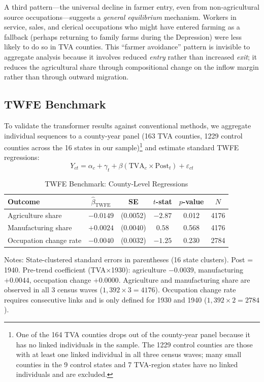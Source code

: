 \documentclass[12pt]{article}
\begin{document}
A third pattern---the universal decline in farmer entry, even from non-agricultural source occupations---suggests a \textit{general equilibrium} mechanism. Workers in service, sales, and clerical occupations who might have entered farming as a fallback (perhaps returning to family farms during the Depression) were less likely to do so in TVA counties. This ``farmer avoidance'' pattern is invisible to aggregate analysis because it involves reduced \textit{entry} rather than increased \textit{exit}; it reduces the agricultural share through compositional change on the inflow margin rather than through outward migration.

\subsection{TWFE Benchmark}

To validate the transformer results against conventional methods, we aggregate individual sequences to a county-year panel (163 TVA counties, \num{1229} control counties across the 16 states in our sample)\footnote{One of the 164 TVA counties drops out of the county-year panel because it has no linked individuals in the sample. The \num{1229} control counties are those with at least one linked individual in all three census waves; many small counties in the 9 control states and 7 TVA-region states have no linked individuals and are excluded.} and estimate standard TWFE regressions:
\begin{equation}
Y_{ct} = \alpha_c + \gamma_t + \beta (\text{TVA}_c \times \text{Post}_t) + \varepsilon_{ct}
\end{equation}

\begin{table}[H]
\centering
\caption{TWFE Benchmark: County-Level Regressions}
\label{tab:twfe}
\begin{threeparttable}
\begin{tabular}{lccccc}
\toprule
Outcome & $\hat{\beta}_{\text{TWFE}}$ & SE & $t$-stat & $p$-value & $N$ \\
\midrule
Agriculture share & $-0.0149$ & (0.0052) & $-2.87$ & 0.012 & \num{4176} \\
Manufacturing share & $+0.0024$ & (0.0040) & $0.58$ & 0.568 & \num{4176} \\
Occupation change rate & $-0.0040$ & (0.0032) & $-1.25$ & 0.230 & \num{2784} \\
\bottomrule
\end{tabular}
\begin{tablenotes}[flushleft]
\small
\item Notes: State-clustered standard errors in parentheses (16 state clusters). Post = 1940. Pre-trend coefficient (TVA$\times$1930): agriculture $-0.0039$, manufacturing $+0.0044$, occupation change $+0.0000$. Agriculture and manufacturing share are observed in all 3 census waves ($1{,}392 \times 3 = \num{4176}$). Occupation change rate requires consecutive links and is only defined for 1930 and 1940 ($1{,}392 \times 2 = \num{2784}$).
\end{tablenotes}
\end{threeparttable}
\end{table}
\end{document}
